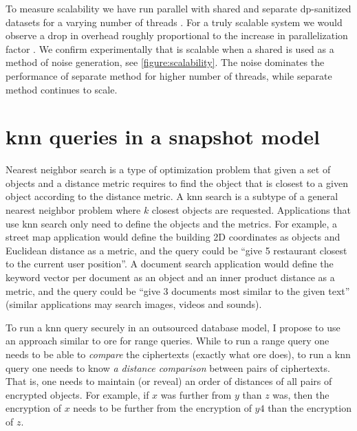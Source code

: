 				To measure scalability we have run parallel \epsolute{} with shared and separate \acrshort{dp}-sanitized datasets \serverDS{} for a varying number of threads \oramsNumber{}.
				For a truly scalable system we would observe a drop in overhead roughly proportional to the increase in parallelization factor \oramsNumber{}.
				We confirm experimentally that \epsolute{} is scalable when a shared \serverDS{} is used as a method of noise generation, see \cref{figure:scalability}.
				The noise dominates the performance of separate \serverDS{} method for higher number of threads, while separate \serverDS{} method continues to scale.

				

	\section{\acrshort{knn} queries in a snapshot model}

		Nearest neighbor search is a type of optimization problem that given a set of objects and a distance metric requires to find the object that is closest to a given object according to the distance metric.
		A \acrfull{knn} search is a subtype of a general nearest neighbor problem where $k$ closest objects are requested.
		Applications that use \acrshort{knn} search only need to define the objects and the metrics.
		For example, a street map application would define the building 2D coordinates as objects and Euclidean distance as a metric, and the query could be ``give 5 restaurant closest to the current user position''.
		A document search application would define the keyword vector per document as an object and an inner product distance as a metric, and the query could be ``give 3 documents most similar to the given text'' (similar applications may search images, videos and sounds).

		To run a \acrshort{knn} query securely in an outsourced database model, I propose to use an approach similar to \acrshort{ore} for range queries.
		While to run a range query one needs to be able to \emph{compare} the ciphertexts (exactly what \acrshort{ore} does), to run a \acrshort{knn} query one needs to know \emph{a distance comparison} between pairs of ciphertexts.
		That is, one needs to maintain (or reveal) an order of distances of all pairs of encrypted objects.
		For example, if $x$ was further from $y$ than $z$ was, then the encryption of $x$ needs to be further from the encryption of $y4$ than the encryption of $z$.

